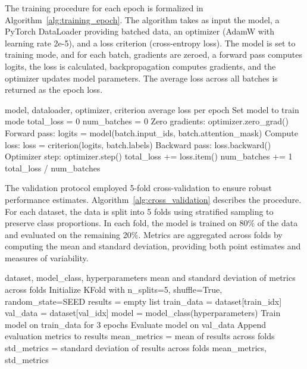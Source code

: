 \documentclass[conference]{IEEEtran}
\begin{document}
The training procedure for each epoch is formalized in Algorithm~\ref{alg:training_epoch}. The algorithm takes as input the model, a PyTorch DataLoader providing batched data, an optimizer (AdamW with learning rate 2e-5), and a loss criterion (cross-entropy loss). The model is set to training mode, and for each batch, gradients are zeroed, a forward pass computes logits, the loss is calculated, backpropagation computes gradients, and the optimizer updates model parameters. The average loss across all batches is returned as the epoch loss.

\begin{algorithm}[h]
\caption{Training Epoch Procedure}
\label{alg:training_epoch}
\begin{algorithmic}[1]
\REQUIRE model, dataloader, optimizer, criterion
\ENSURE average loss per epoch
\STATE Set model to train mode
\STATE total\_loss = 0
\STATE num\_batches = 0
    \STATE Zero gradients: optimizer.zero\_grad()
    \STATE Forward pass: logits = model(batch.input\_ids, batch.attention\_mask)
    \STATE Compute loss: loss = criterion(logits, batch.labels)
    \STATE Backward pass: loss.backward()
    \STATE Optimizer step: optimizer.step()
    \STATE total\_loss += loss.item()
    \STATE num\_batches += 1
\ENDFOR
\RETURN total\_loss / num\_batches
\end{algorithmic}
\end{algorithm}

The validation protocol employed 5-fold cross-validation to ensure robust performance estimates. Algorithm~\ref{alg:cross_validation} describes the procedure. For each dataset, the data is split into 5 folds using stratified sampling to preserve class proportions. In each fold, the model is trained on 80\% of the data and evaluated on the remaining 20\%. Metrics are aggregated across folds by computing the mean and standard deviation, providing both point estimates and measures of variability.

\begin{algorithm}[h]
\caption{5-Fold Cross-Validation Protocol}
\label{alg:cross_validation}
\begin{algorithmic}[1]
\REQUIRE dataset, model\_class, hyperparameters
\ENSURE mean and standard deviation of metrics across folds
\STATE Initialize KFold with n\_splits=5, shuffle=True, random\_state=SEED
\STATE results = empty list
    \STATE train\_data = dataset[train\_idx]
    \STATE val\_data = dataset[val\_idx]
    \STATE model = model\_class(hyperparameters)
    \STATE Train model on train\_data for 3 epochs
    \STATE Evaluate model on val\_data
    \STATE Append evaluation metrics to results
\ENDFOR
\STATE mean\_metrics = mean of results across folds
\STATE std\_metrics = standard deviation of results across folds
\RETURN mean\_metrics, std\_metrics
\end{algorithmic}
\end{algorithm}
\end{document}
